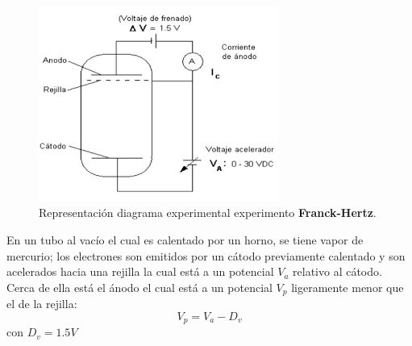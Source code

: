 \documentclass{article}									%
\begin{document}
\begin{figure}[H]
  \centering
     \includegraphics[width=0.7\textwidth]{diagrama}
  \caption{Representación diagrama experimental experimento \textbf{Franck-Hertz}.}
      \label{fig:diagrama}
\end{figure}
En un tubo al vacío el cual es calentado por un horno, se tiene vapor de mercurio; los electrones son emitidos por un cátodo previamente calentado y son acelerados hacia una rejilla la cual está a un potencial $V_{a}$ relativo al cátodo. Cerca de ella está el ánodo el cual está a un potencial $V_{p}$ ligeramente menor que el de la rejilla:
\begin{equation}
	V_{p} = V_{a}-D_{v}
\end{equation}
 con $D_{v} = 1.5V $
\end{document}
